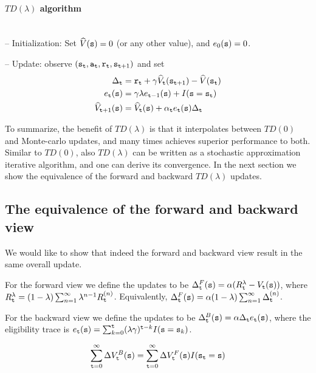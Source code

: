 \paragraph{$TD(\lambda)$ algorithm}\ \\

 -- Initialization: Set $\widehat{V}({\tt s})=0$ (or any other value), and
 $e_0({\tt s})=0$.

 -- Update: observe $({\tt s}_{\tt t},{\tt a}_{\tt t},{\tt r}_{\tt t},{\tt s}_{{\tt t}+1})$ and set
\begin{align*}
\Delta_{\tt t} &= {\tt r}_{\tt t} +\gamma \widehat{V}_{\tt t}({\tt s}_{{\tt t}+1})-\widehat{V}({\tt s}_{\tt t})\\
e_{\tt t}({\tt s}) &= \gamma\lambda e_{{\tt t}-1}({\tt s})+I({\tt s}={\tt s}_{\tt t})\\
\widehat{V}_{{\tt t}+1}({\tt s}) &=
\widehat{V}_{\tt t}({\tt s})+\alpha_{\tt t} e_{\tt t}
({\tt s})\Delta_{\tt t}
\end{align*}

 To summarize, the
benefit of $TD(\lambda)$ is that it interpolates between $TD(0)$ and
Monte-carlo updates, and many times achieves superior performance to
both.
%
Similar to $TD(0)$, also  $TD(\lambda)$ can be written as a
stochastic approximation iterative algorithm, and one can derive its
convergence.
%
In the next section we show the equivalence of the forward and
backward $TD(\lambda)$ updates.
%

\subsection{The equivalence of the forward and backward view}

We would like to show that indeed the forward and backward view
result in the same overall update.

For the forward view we define the updates to be
$\Delta^F_{\tt t}({\tt s})=\alpha(R^\lambda_{\tt t}-V_{\tt t}({\tt s}))$,
where $R^\lambda_{\tt t}=(1-\lambda)\sum_{n=1}^\infty
\lambda^{n-1}R_{\tt t}^{(n)}$. Equivalently,
$\Delta^F_{\tt t}({\tt s})=\alpha (1-\lambda)\sum_{n=1}^\infty
\Delta_{\tt t} ^{(n)}$.


For the backward view we define the updates to be
$\Delta^B_{\tt t}({\tt s})=\alpha\Delta_{\tt t} e_{\tt t}({\tt s})$,
where the eligibility trace is
$e_{\tt t}({\tt s})=\sum_{k=0}^{\tt t}(\lambda\gamma)^{{\tt t}-k}I({\tt s}={\tt s}_k)$.

\begin{theorem}
\[
\sum_{{\tt t}=0}^{\infty} \Delta V ^B_{\tt t}
({\tt s})=\sum_{{\tt t}=0}^{\infty} \Delta V_{\tt t}^F({\tt s})
I({\tt s}_{\tt t}={\tt s})
\]
\end{theorem}

